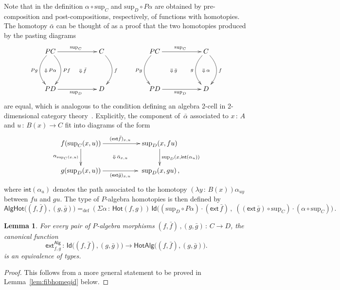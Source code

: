 \documentclass[10pt,a4paper,oneside,reqno]{amsart}
\numberwithin{equation}{section}
\theoremstyle{mythm}
\newtheorem{lemma}[theorem]{Lemma}
\theoremstyle{mydef}
\theoremstyle{myrmk}
\newcommand{\defeq}{=_{\mathrm{def}}}
\newcommand{\co}{\,{:}\,}
\newcommand{\ct}{\cdot}
\newcommand{\Hot}{\mathsf{Hot}}
\newcommand{\ext}{\mathsf{ext}}
\renewcommand{\int}{\mathsf{int}}
\newcommand{\Id}{\mathsf{Id}}
\newcommand{\Palg}{\mathsf{Alg}}
\renewcommand{\sup}{\mathrm{sup}}
\newcommand{\AlgHot}{\mathsf{AlgHot}}
\begin{document}
Note that in the definition $\alpha \circ \sup_C$ and $\sup_D \circ P \alpha$ are obtained by pre-composition and post-compositions, respectively, of functions with homotopies. The homotopy $\bar{\alpha}$ can be thought of as a proof that the two homotopies produced by the pasting diagrams
\[
\xymatrix@C=2cm@R=1.5cm{
PC \ar[r]^{\sup_C} \ar@/_1.3pc/[d]_{Pg}  \ar@/^1.3pc/[d]^{Pf}  \ar@{}[dr]|{\qquad \Downarrow \, \bar{f}}
\ar@{}[d]|{\Downarrow \, P\alpha}
  & C \ar@/^1.3pc/[d]^{f} \\ 
PD \ar[r]_{\sup_D} & D} \qquad
\xymatrix@C=2cm@R=1.5cm{
PC \ar[r]^{\sup_C} \ar@/_1.3pc/[d]_{Pg}  \ar@{}[dr]|{\Downarrow \, \bar{g} \qquad} & C \ar@/^1.3pc/[d]^{f} \ar@/_1.3pc/[d]_{g} \ar@{}[d]|{\Downarrow \, \alpha} \\ 
PD \ar[r]_{\sup_D} & D} 
\]
are equal, which is analogous to the condition defining an algebra 2-cell in 2-dimensional category 
theory~\cite{BlackwellR:twodmt}.   Explicitly, the
component of~$\bar{\alpha}$ associated to $x \co A$ and $u \co B(x) \to C$ fit into diagrams of the form
\[
\xymatrix@C=1.8cm{
f (\sup_C(x,u)) 
\ar[r]^{(\ext \bar{f})_{x,u}}
\ar[d]_{\alpha_{\sup_C(x,u)}} 
\ar@{}[dr]|{\Downarrow \, \bar{\alpha}_{x,u}}  & 
 \sup_D(x, fu) \ar[d]^{\sup_D(x, \int( \alpha_u))} \\
g (\sup_D(x,u)) \ar[r]_{(\ext \bar{g})_{x,u}} &\;  \sup_D(x, gu) \, ,}
\]
where $\int(\alpha_u)$ denotes the path associated to the homotopy 
$(\lambda y \co B(x)) \alpha_{uy}$ between $fu$ and $gu$.
The type of $P$-algebra homotopies is then defined by
\[
\AlgHot \big( (f,\bar{f}), (g, \bar{g})  \big)
 \defeq  
(\Sigma \alpha \co \Hot(  f , g)) \, \Id\big( 
( \sup_D \circ P \alpha ) \ct  (\ext \, \bar{f}) \, , \;  ( (\ext \, \bar{g}) \circ \sup_C) \cdot (\alpha \circ \sup_C)
 \big) \, .
\]


\newcommand{\HotAlg}{\mathsf{HotAlg}}


\begin{lemma}\label{IdEqHo}
For every pair of $P$-algebra morphisms $(f, \bar{f}) \, , (g, \bar{g}) \co C \to D$,  
the canonical function
\[
\ext^{\Palg}_{f,g}  \co 
\Id\big((f, \bar{f}), (g, \bar{g})\big) \to \HotAlg \big((f, \bar{f}), (g, \bar{g})\big).
\]
 is an equivalence of types. 
\end{lemma}

\begin{proof}
This follows from a more general statement to be proved in Lemma~\ref{lem:fibhomeqid} below.
\end{proof}
\end{document}
